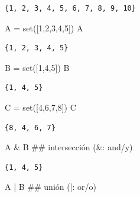 \documentclass[
  letterpaper,
  DIV=11,
  numbers=noendperiod]{scrreprt}
\newenvironment{Shaded}{\begin{snugshade}}{\end{snugshade}}
\newcommand{\BuiltInTok}[1]{\textcolor[rgb]{0.00,0.23,0.31}{#1}}
\newcommand{\CommentTok}[1]{\textcolor[rgb]{0.37,0.37,0.37}{#1}}
\newcommand{\DecValTok}[1]{\textcolor[rgb]{0.68,0.00,0.00}{#1}}
\newcommand{\NormalTok}[1]{\textcolor[rgb]{0.00,0.23,0.31}{#1}}
\newcommand{\OperatorTok}[1]{\textcolor[rgb]{0.37,0.37,0.37}{#1}}
\begin{document}
\begin{verbatim}
{1, 2, 3, 4, 5, 6, 7, 8, 9, 10}
\end{verbatim}

\begin{Shaded}
\begin{Highlighting}[]
\NormalTok{A }\OperatorTok{=} \BuiltInTok{set}\NormalTok{([}\DecValTok{1}\NormalTok{,}\DecValTok{2}\NormalTok{,}\DecValTok{3}\NormalTok{,}\DecValTok{4}\NormalTok{,}\DecValTok{5}\NormalTok{])}
\NormalTok{A}
\end{Highlighting}
\end{Shaded}

\begin{verbatim}
{1, 2, 3, 4, 5}
\end{verbatim}

\begin{Shaded}
\begin{Highlighting}[]
\NormalTok{B }\OperatorTok{=} \BuiltInTok{set}\NormalTok{([}\DecValTok{1}\NormalTok{,}\DecValTok{4}\NormalTok{,}\DecValTok{5}\NormalTok{])}
\NormalTok{B}
\end{Highlighting}
\end{Shaded}

\begin{verbatim}
{1, 4, 5}
\end{verbatim}

\begin{Shaded}
\begin{Highlighting}[]
\NormalTok{C }\OperatorTok{=} \BuiltInTok{set}\NormalTok{([}\DecValTok{4}\NormalTok{,}\DecValTok{6}\NormalTok{,}\DecValTok{7}\NormalTok{,}\DecValTok{8}\NormalTok{])}
\NormalTok{C}
\end{Highlighting}
\end{Shaded}

\begin{verbatim}
{8, 4, 6, 7}
\end{verbatim}

\begin{Shaded}
\begin{Highlighting}[]
\NormalTok{A }\OperatorTok{\&}\NormalTok{ B   }\CommentTok{\#\# intersección (\&: and/y)}
\end{Highlighting}
\end{Shaded}

\begin{verbatim}
{1, 4, 5}
\end{verbatim}

\begin{Shaded}
\begin{Highlighting}[]
\NormalTok{A }\OperatorTok{|}\NormalTok{ B   }\CommentTok{\#\# unión (|: or/o)}
\end{Highlighting}
\end{Shaded}
\end{document}
